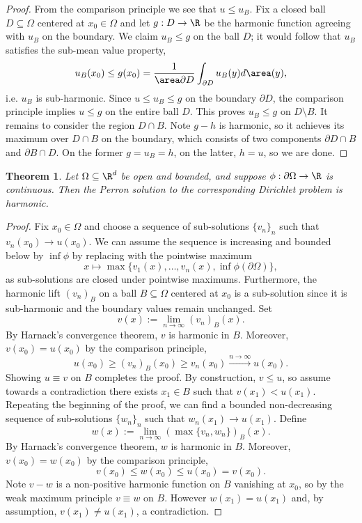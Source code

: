 \documentclass[reqno]{amsart}
\newtheorem{theorem}{Theorem}
\theoremstyle{definition}
\theoremstyle{remark}
\newcounter{problem}[section]	\declaretheorem[style=thmrecbox,name=Problem, numberlike=problem]{statement}
\begin{document}
\begin{proof}
	From the comparison principle we see that $u \leq u_B$. Fix a closed ball $D \subseteq \Omega$ centered at $x_0 \in \Omega$ and let $g : D \to \R$ be the harmonic function agreeing with $u_B$ on the boundary. We claim $u_B \leq g$ on the ball $D$; it would follow that $u_B$ satisfies the sub-mean value property,
		\[ u_B(x_0) \leq g(x_0) = \frac{1}{\area \partial D} \int_{\partial D} u_B (y) d \area (y), \]
	i.e. $u_B$ is sub-harmonic. Since $u \leq u_B \leq g$ on the boundary $\partial D$, the comparison principle implies $u \leq g$ on the entire ball $D$. This proves $u_B \leq g$ on $D \setminus B$. It remains to consider the region $D \cap B$. Note $g - h$ is harmonic, so it achieves its maximum over $D \cap B$ on the boundary, which consists of two components $\partial D \cap B$ and $\partial B \cap D$. On the former $g = u_B = h$, on the latter, $h = u$, so we are done. 
\end{proof}

\begin{theorem}
	Let $\Omega \subseteq \R^d$ be open and bounded, and suppose $\phi : \partial \Omega \to \R$ is continuous. Then the Perron solution to the corresponding Dirichlet problem is harmonic. 
\end{theorem}

\begin{proof}
	Fix $x_0 \in \Omega$ and choose a sequence of sub-solutions $\{ v_n \}_n$ such that $v_n (x_0) \to u(x_0)$. We can assume the sequence is increasing and bounded below by $\inf \phi$ by replacing with the pointwise maximum	 
		\[ x \mapsto \max \{ v_1(x), \dots, v_n (x), \inf \phi (\partial \Omega) \}, \]
	as sub-solutions are closed under pointwise maximums. Furthermore, the harmonic lift $(v_n)_B$ on a ball $B \subseteq \Omega$ centered at $x_0$ is a sub-solution since it is sub-harmonic and the boundary values remain unchanged. Set
		\[ v(x) := \lim_{n \to \infty} (v_n)_B (x). \]
	By Harnack's convergence theorem, $v$ is harmonic in $B$. Moreover, $v(x_0) = u(x_0)$ by the comparison principle,
		\[ u(x_0) \geq (v_n)_B (x_0) \geq v_n (x_0) \overset{n \to \infty}{\longrightarrow} u(x_0). \]
	Showing $u \equiv v$ on $B$ completes the proof. By construction, $v \leq u$, so assume towards a contradiction there exists $x_1 \in B$ such that $v(x_1) < u(x_1)$. Repeating the beginning of the proof, we can find a bounded non-decreasing sequence of sub-solutions $\{ w_n \}_n$ such that $w_n (x_1) \to u(x_1)$. Define
		\[ w(x) := \lim_{n \to \infty} (\max \{ v_n, w_n \})_B (x). \]
	By Harnack's convergence theorem, $w$ is harmonic in $B$. Moreover, $v(x_0) = w(x_0)$ by the comparison principle, 
		\[ v(x_0) \leq w(x_0) \leq u(x_0) = v(x_0). \]
	Note $v - w$ is a non-positive harmonic function on $B$ vanishing at $x_0$, so by the weak maximum principle $v \equiv w$ on $B$. However $w(x_1) = u(x_1)$ and, by assumption, $v(x_1) \neq u(x_1)$, a contradiction. 		
\end{proof}
\end{document}
